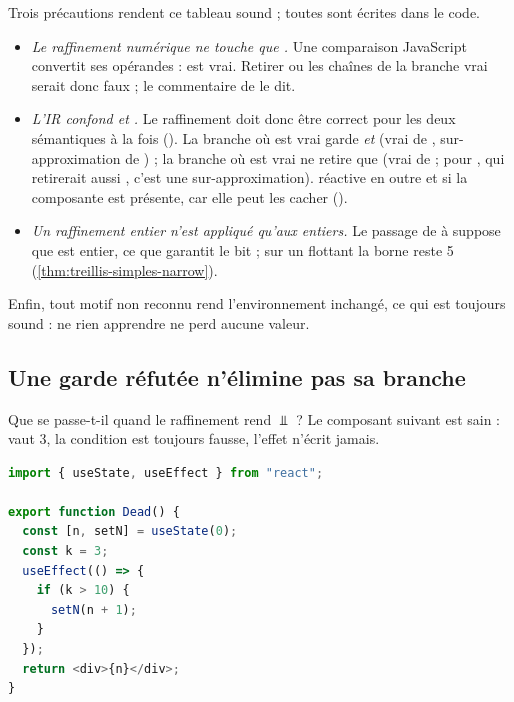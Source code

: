 Trois précautions rendent ce tableau sound ; toutes sont écrites dans le
code.
\begin{itemize}
  \item \emph{Le raffinement numérique ne touche que .} Une
    comparaison JavaScript convertit ses opérandes :  est
    vrai. Retirer  ou les chaînes de la branche \og vrai\fg{}
    serait donc faux ; le commentaire de
     le dit.
  \item \emph{L'IR confond \code{==} et \code{===}.} Le raffinement doit donc
    être correct pour les deux sémantiques à la fois
    (). La branche où
     est vrai garde  \emph{et} 
    (vrai de \code{==}, sur-approximation de \code{===}) ; la branche où
     est vrai ne retire que  (vrai de
    \code{!==} ; pour \code{!=}, qui retirerait aussi ,
    c'est une sur-approximation).  réactive en
    outre  et  si la composante  est
    présente, car elle peut les cacher
    ().
  \item \emph{Un raffinement entier n'est appliqué qu'aux entiers.} Le
    passage de  à  suppose que  est
    entier, ce que garantit le bit  ; sur un flottant la borne
    reste 5 (\cref{thm:treillis-simples-narrow}).
\end{itemize}
Enfin, tout motif non reconnu rend l'environnement inchangé, ce qui est
toujours sound : ne rien apprendre ne perd aucune valeur.

\subsection{Une garde réfutée n'élimine pas sa branche}

Que se passe-t-il quand le raffinement rend $\Bot$ ? Le composant suivant est
sain :  vaut 3, la condition  est toujours fausse,
l'effet n'écrit jamais.

\begin{lstlisting}[language=TypeScript,caption={Une branche morte (\file{/tmp/ch12/dead.tsx})},label={lst:cfg-analyzer-dominance-dead}]
import { useState, useEffect } from "react";

export function Dead() {
  const [n, setN] = useState(0);
  const k = 3;
  useEffect(() => {
    if (k > 10) {
      setN(n + 1);
    }
  });
  return <div>{n}</div>;
}
\end{lstlisting}


